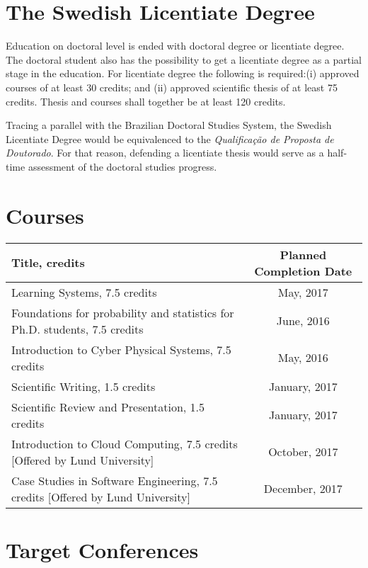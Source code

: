 \documentclass[]{article}
\begin{document}
\section*{The Swedish Licentiate Degree}

Education on doctoral level is ended with doctoral degree or licentiate degree. The doctoral student also has the possibility to get a licentiate degree as a partial stage in the education. For licentiate degree the following is required:(i) approved courses of at least 30 credits; and (ii) approved scientific thesis of at least 75 credits. Thesis and courses shall together be at least 120 credits.

Tracing a parallel with the Brazilian Doctoral Studies System, the Swedish Licentiate Degree would be equivalenced to the \textit{Qualifica\c{c}\~{a}o de Proposta de Doutorado}. For that reason, defending a licentiate thesis would serve as a half-time assessment of the doctoral studies progress. 

\section*{Courses}

\begin{center}
	\label{courses}
	\begin{tabular}{|p{7.5cm}|c|} 	 
		\hline	
		\textbf{Title, credits} & \textbf{Planned Completion Date} \\ \hline	
		Learning Systems, 7.5 credits & May, 2017 \\ \hline	
		Foundations for probability and statistics for Ph.D. students, 7.5 credits & June, 2016 \\ \hline	
		Introduction to Cyber Physical Systems, 7.5 credits & May, 2016 \\ \hline	
		Scientific Writing, 1.5 credits & January, 2017 \\ \hline	
		Scientific Review and Presentation, 1.5 credits & January, 2017 \\ \hline
		Introduction to Cloud Computing, 7.5 credits [Offered by Lund University] & October, 2017 \\ \hline	
		Case Studies in Software Engineering, 7.5 credits [Offered by Lund University] & December, 2017 \\ \hline			 		 
	\end{tabular}
\end{center}

\section*{Target Conferences}
\end{document}
